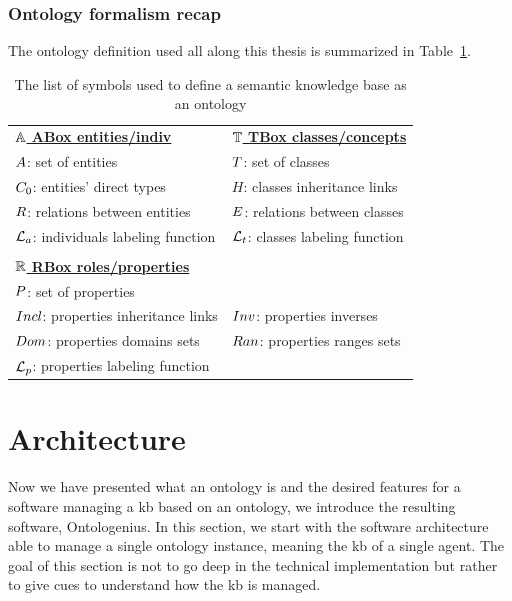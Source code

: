 \subsubsection{Ontology formalism recap}

The ontology definition used all along this thesis is summarized in Table~\ref{tab:onto_symboles}.

\begin{table}[ht!]
\caption{The list of symbols used to define a semantic knowledge base as an ontology }
\label{tab:onto_symboles}
\begin{tabular}{ll}
{\ul \textbf{$\mathbb{A}$ ABox entities/indiv}} & {\ul \textbf{$\mathbb{T}$ TBox classes/concepts}}  \\
$A$: set of entities               & $T$: set of classes  \\
$C_0$: entities' direct types        & $H$: classes inheritance links \\
$R$: relations between entities    & $E$: relations between classes  \\
$\mathcal{L}_a$: individuals labeling function & $\mathcal{L}_t$: classes labeling function \\
 & \\
\multicolumn{2}{l}{{\ul \textbf{$\mathbb{R}$ RBox roles/properties}}}                          \\
$P$: set of properties              &                                              \\
$Incl$: properties inheritance links       & $Inv$: properties inverses                   \\
$Dom$: properties domains sets     & $Ran$: properties ranges sets   \\
$\mathcal{L}_p$: properties labeling function & \\
\end{tabular}
\end{table}

\section{Architecture}

Now we have presented what an ontology is and the desired features for a software managing a \acrfull{kb} based on an ontology, we introduce the resulting software, Ontologenius. In this section, we start with the software architecture able to manage a single ontology instance, meaning the \acrshort{kb} of a single agent. The goal of this section is not to go deep in the technical implementation but rather to give cues to understand how the \acrshort{kb} is managed.

